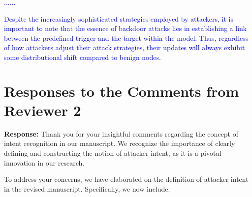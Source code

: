 \documentclass[a4paper,twoside,11pt,dvipsnames]{reviewresponse}
\begin{document}
\textcolor{blue}{......}

\textcolor{blue}{Despite the increasingly sophisticated strategies employed by attackers, it is important to note that the essence of backdoor attacks lies in establishing a link between the predefined trigger and the target within the model. Thus, regardless of how attackers adjust their attack strategies, their updates will always exhibit some distributional shift compared to benign nodes.}


\newpage

\section{Responses to the Comments from Reviewer 2}









\textbf{Response:}
Thank you for your insightful comments regarding the concept of intent recognition in our manuscript. We recognize the importance of clearly defining and constructing the notion of attacker intent, as it is a pivotal innovation in our research.

To address your concerns, we have elaborated on the definition of attacker intent in the revised manuscript. Specifically, we now include:
\end{document}
